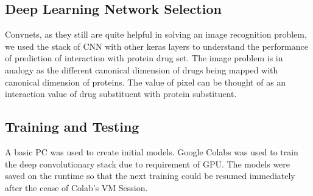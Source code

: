\iffalse
\subsection{Creating Analogy with Image}
For any protein sequence, instead of regarding them as segments, we try to run the whole protein sequence as an image: the residual contacts representing the pixels of the image.
\fi

\subsection{Deep Learning Network Selection}
Convnets, as they still are quite helpful in solving an image recognition problem, we used the stack of CNN with other keras layers to understand the performance of prediction of interaction with protein drug set. The image problem is in analogy as the different canonical dimension of drugs being mapped with canonical dimension of proteins. The value of pixel can be thought of as an interaction value of drug substituent with protein substituent.

\subsection{Training and Testing}
A basic PC was used to create initial models. Google Colabs was used to train the deep convolutionary stack due to requirement of GPU. The models were saved on the runtime so that the next training could be resumed immediately after the cease of Colab's VM Session.
